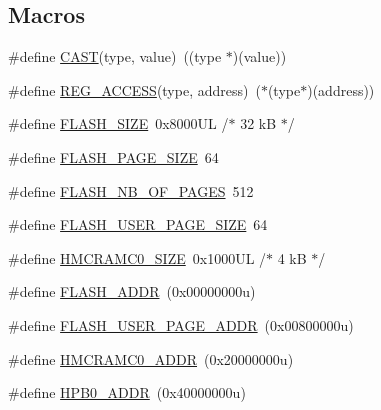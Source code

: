 \subsection*{Macros}
\begin{DoxyCompactItemize}
\item 
\#define \mbox{\hyperlink{group___s_a_m_d21_e15_b_u__definitions_ga015dfee129875688293180ddef474138}{C\+A\+ST}}(type,  value)~((type $\ast$)(value))
\item 
\#define \mbox{\hyperlink{group___s_a_m_d21_e15_b_u__definitions_gad9dd6ceb323c1d2d3caf66d30ea9a47b}{R\+E\+G\+\_\+\+A\+C\+C\+E\+SS}}(type,  address)~($\ast$(type$\ast$)(address))
\item 
\#define \mbox{\hyperlink{group___s_a_m_d21_e15_b_u__definitions_gae69620948dea1b76e0ab7843ab719db7}{F\+L\+A\+S\+H\+\_\+\+S\+I\+ZE}}~0x8000\+U\+L /$\ast$ 32 k\+B $\ast$/
\item 
\#define \mbox{\hyperlink{group___s_a_m_d21_e15_b_u__definitions_ga4cc14e2c99ae7f8e5a8e371d03c8532c}{F\+L\+A\+S\+H\+\_\+\+P\+A\+G\+E\+\_\+\+S\+I\+ZE}}~64
\item 
\#define \mbox{\hyperlink{group___s_a_m_d21_e15_b_u__definitions_ga264f8ab3607e09ec028c32cb7538fd91}{F\+L\+A\+S\+H\+\_\+\+N\+B\+\_\+\+O\+F\+\_\+\+P\+A\+G\+ES}}~512
\item 
\#define \mbox{\hyperlink{group___s_a_m_d21_e15_b_u__definitions_ga595d6fe8572383d794338e55614a5a7f}{F\+L\+A\+S\+H\+\_\+\+U\+S\+E\+R\+\_\+\+P\+A\+G\+E\+\_\+\+S\+I\+ZE}}~64
\item 
\#define \mbox{\hyperlink{group___s_a_m_d21_e15_b_u__definitions_gaaf0b3acc28d2637a807c6c6c033a63a6}{H\+M\+C\+R\+A\+M\+C0\+\_\+\+S\+I\+ZE}}~0x1000\+U\+L /$\ast$ 4 k\+B $\ast$/
\item 
\#define \mbox{\hyperlink{group___s_a_m_d21_e15_b_u__definitions_ga485a21e55bcc66416a04d2fec83513fa}{F\+L\+A\+S\+H\+\_\+\+A\+D\+DR}}~(0x00000000u)
\item 
\#define \mbox{\hyperlink{group___s_a_m_d21_e15_b_u__definitions_ga263dc504b29b21d616514ac65000957e}{F\+L\+A\+S\+H\+\_\+\+U\+S\+E\+R\+\_\+\+P\+A\+G\+E\+\_\+\+A\+D\+DR}}~(0x00800000u)
\item 
\#define \mbox{\hyperlink{group___s_a_m_d21_e15_b_u__definitions_gab60016bed594251a4955f546002d126f}{H\+M\+C\+R\+A\+M\+C0\+\_\+\+A\+D\+DR}}~(0x20000000u)
\item 
\#define \mbox{\hyperlink{group___s_a_m_d21_e15_b_u__definitions_gaa3dc0741f009f571f4a45086601718f6}{H\+P\+B0\+\_\+\+A\+D\+DR}}~(0x40000000u)
\item 

\end{DoxyCompactItemize}
